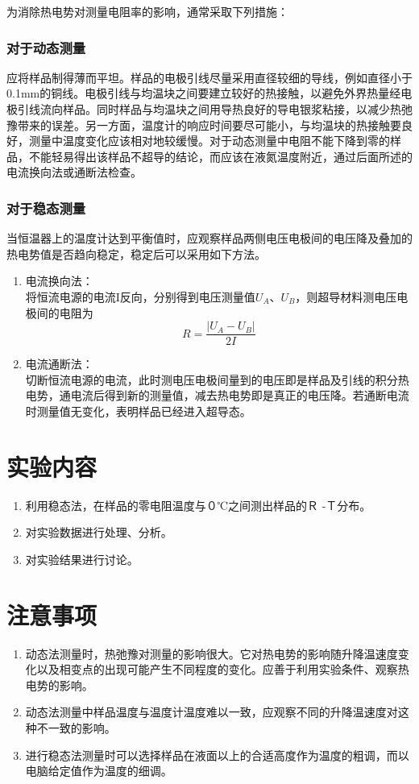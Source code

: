 \documentclass[a4paper]{article}
\begin{document}
为消除热电势对测量电阻率的影响，通常采取下列措施：
\subsubsection{对于动态测量}
应将样品制得薄而平坦。样品的电极引线尽量采用直径较细的导线，例如直径小于0.1mm的铜线。电极引线与均温块之间要建立较好的热接触，以避免外界热量经电极引线流向样品。同时样品与均温块之间用导热良好的导电银浆粘接，以减少热弛豫带来的误差。另一方面，温度计的响应时间要尽可能小，与均温块的热接触要良好，测量中温度变化应该相对地较缓慢。对于动态测量中电阻不能下降到零的样品，不能轻易得出该样品不超导的结论，而应该在液氮温度附近，通过后面所述的电流换向法或通断法检查。
\subsubsection{对于稳态测量}
当恒温器上的温度计达到平衡值时，应观察样品两侧电压电极间的电压降及叠加的热电势值是否趋向稳定，稳定后可以采用如下方法。
\begin{enumerate}
\item 电流换向法：\\
将恒流电源的电流I反向，分别得到电压测量值$U_A$、$U_B$，则超导材料测电压电极间的电阻为
\begin{equation}
R = \frac{|U_A-U_B|}{2I}\label{eq3}
\end{equation}
\item 电流通断法：\\
切断恒流电源的电流，此时测电压电极间量到的电压即是样品及引线的积分热电势，通电流后得到新的测量值，减去热电势即是真正的电压降。若通断电流时测量值无变化，表明样品已经进入超导态。
\end{enumerate}

\section{实验内容}
\begin{enumerate}
\item 利用稳态法，在样品的零电阻温度与０℃之间测出样品的Ｒ -Ｔ分布。
\item 对实验数据进行处理、分析。
\item 对实验结果进行讨论。
\end{enumerate}

\section{注意事项}
\begin{enumerate}
\item 动态法测量时，热弛豫对测量的影响很大。它对热电势的影响随升降温速度变化以及相变点的出现可能产生不同程度的变化。应善于利用实验条件、观察热电势的影响。
\item 动态法测量中样品温度与温度计温度难以一致，应观察不同的升降温速度对这种不一致的影响。
\item 进行稳态法测量时可以选择样品在液面以上的合适高度作为温度的粗调，而以电脑给定值作为温度的细调。
\end{enumerate}
\end{document}
